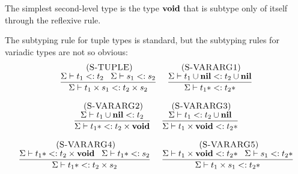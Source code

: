 The simplest second-level type is the type $\mathbf{void}$ that
is subtype only of itself through the reflexive rule.

The subtyping rule for tuple types is standard, but the subtyping
rules for variadic types are not so obvious:
\[
\begin{array}{c}
\begin{array}{c}
\; (\textsc{S-TUPLE})\\
\dfrac{\Sigma \vdash t_{1} <: t_{2} \;\;\;
       \Sigma \vdash s_{1} <: s_{2}}
      {\Sigma \vdash t_{1} \times s_{1} <: t_{2} \times s_{2}}
\end{array}
\;
\begin{array}{c}
\; (\textsc{S-VARARG1})\\
\dfrac{\Sigma \vdash t_{1} \cup \mathbf{nil} <: t_{2} \cup \mathbf{nil}}
      {\Sigma \vdash t_{1}{*} <: t_{2}{*}}
\end{array}
\\ \\
\begin{array}{c}
\; (\textsc{S-VARARG2})\\
\dfrac{\Sigma \vdash t_{1} \cup \mathbf{nil} <: t_{2}}
      {\Sigma \vdash t_{1}{*} <: t_{2} \times \mathbf{void}}
\end{array}
\;
\begin{array}{c}
\; (\textsc{S-VARARG3})\\
\dfrac{\Sigma \vdash t_{1} <: t_{2} \cup \mathbf{nil}}
      {\Sigma \vdash t_{1} \times \mathbf{void} <: t_{2}{*}}
\end{array}
\\ \\
\begin{array}{c}
\; (\textsc{S-VARARG4})\\
\dfrac{\Sigma \vdash t_{1}{*} <: t_{2} \times \mathbf{void} \;\;\;
       \Sigma \vdash t_{1}{*} <: s_{2}}
      {\Sigma \vdash t_{1}{*} <: t_{2} \times s_{2}}
\end{array}
\;
\begin{array}{c}
\; (\textsc{S-VARARG5})\\
\dfrac{\Sigma \vdash t_{1} \times \mathbf{void} <: t_{2}{*} \;\;\;
       \Sigma \vdash s_{1} <: t_{2}{*}}
      {\Sigma \vdash t_{1} \times s_{1} <: t_{2}{*}}
\end{array}
\end{array}
\]

